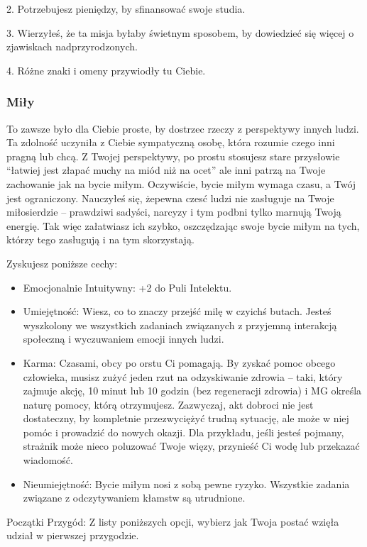 2. Potrzebujesz pieniędzy, by sfinansować swoje studia.

3. Wierzyłeś, że ta misja byłaby świetnym sposobem, by dowiedzieć się więcej o zjawiskach nadprzyrodzonych.

4. Różne znaki i omeny przywiodły tu Ciebie.

\subsubsection{Miły}

To zawsze było dla Ciebie proste, by dostrzec rzeczy z perspektywy innych ludzi. Ta zdolność uczyniła z Ciebie sympatyczną osobę, która rozumie czego inni pragną lub chcą. Z Twojej perspektywy, po prostu stosujesz stare przysłowie “łatwiej jest złapać muchy na miód niż na ocet” ale inni patrzą na Twoje zachowanie jak na bycie miłym. Oczywiście, bycie miłym wymaga czasu, a Twój jest ograniczony. Nauczyłeś się, żepewna czesć ludzi nie zasługuje na Twoje miłosierdzie – prawdziwi sadyści, narcyzy i tym podbni tylko marnują Twoją energię. Tak więc załatwiasz ich szybko, oszczędzając swoje bycie miłym na tych, którzy tego zasługują i na tym skorzystają. 

Zyskujesz poniższe cechy:
\begin{itemize}
\item  Emocjonalnie Intuitywny: +2 do Puli Intelektu.
\item Umiejętność: Wiesz, co to znaczy przejść milę w czyichś butach. Jesteś wyszkolony we wszystkich zadaniach związanych z przyjemną interakcją społeczną i wyczuwaniem emocji innych ludzi.
\item Karma: Czasami, obcy po orstu Ci pomagają. By zyskać pomoc obcego człowieka, musisz zużyć jeden rzut na odzyskiwanie zdrowia – taki, który zajmuje akcję, 10 minut lub 10 godzin (bez regeneracji zdrowia) i MG określa naturę pomocy, którą otrzymujesz. Zazwyczaj, akt dobroci nie jest dostateczny, by kompletnie przezwyciężyć trudną sytuację, ale może w niej pomóc i prowadzić do nowych okazji. Dla przykładu, jeśli jesteś pojmany, strażnik może nieco poluzować Twoje więzy, przynieść Ci wodę lub przekazać wiadomość.
\item Nieumiejętność: Bycie miłym nosi z sobą pewne ryzyko. Wszystkie zadania związane z odczytywaniem kłamstw są utrudnione. 
\end{itemize}    
    
Początki Przygód: Z listy poniższych opcji, wybierz jak Twoja postać wzięła udział w pierwszej przygodzie.

